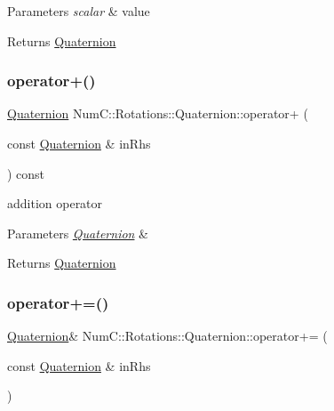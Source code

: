 \begin{DoxyParams}{Parameters}
{\em scalar} & value \\
\hline
\end{DoxyParams}
\begin{DoxyReturn}{Returns}
\mbox{\hyperlink{class_num_c_1_1_rotations_1_1_quaternion}{Quaternion}} 
\end{DoxyReturn}
\mbox{\label{class_num_c_1_1_rotations_1_1_quaternion_a68e13eed7b24a8f26514ccdd4a1728bc}} 
\subsubsection{\texorpdfstring{operator+()}{operator+()}}
{\footnotesize\ttfamily \mbox{\hyperlink{class_num_c_1_1_rotations_1_1_quaternion}{Quaternion}} Num\+C\+::\+Rotations\+::\+Quaternion\+::operator+ (\begin{DoxyParamCaption}\item[{const \mbox{\hyperlink{class_num_c_1_1_rotations_1_1_quaternion}{Quaternion}} \&}]{in\+Rhs }\end{DoxyParamCaption}) const\hspace{0.3cm}{\ttfamily [inline]}}

addition operator


\begin{DoxyParams}{Parameters}
{\em \mbox{\hyperlink{class_num_c_1_1_rotations_1_1_quaternion}{Quaternion}}} & \\
\hline
\end{DoxyParams}
\begin{DoxyReturn}{Returns}
\mbox{\hyperlink{class_num_c_1_1_rotations_1_1_quaternion}{Quaternion}} 
\end{DoxyReturn}
\mbox{\label{class_num_c_1_1_rotations_1_1_quaternion_a5dda8feb935b5b91a9446b368c6c6fc5}} 
\subsubsection{\texorpdfstring{operator+=()}{operator+=()}}
{\footnotesize\ttfamily \mbox{\hyperlink{class_num_c_1_1_rotations_1_1_quaternion}{Quaternion}}\& Num\+C\+::\+Rotations\+::\+Quaternion\+::operator+= (\begin{DoxyParamCaption}\item[{const \mbox{\hyperlink{class_num_c_1_1_rotations_1_1_quaternion}{Quaternion}} \&}]{in\+Rhs }\end{DoxyParamCaption})\hspace{0.3cm}{\ttfamily [inline]}}

